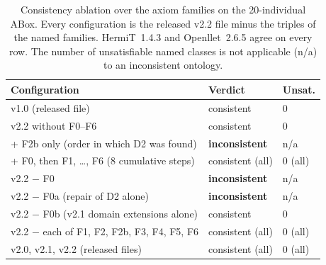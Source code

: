 \begin{table}[!t]
\caption{Consistency ablation over the axiom families on the 20-individual ABox. Every configuration is the released v2.2 file minus the triples of the named families. HermiT~1.4.3 and Openllet~2.6.5 agree on every row. The number of unsatisfiable named classes is not applicable (n/a) to an inconsistent ontology.}
\label{tab:hermit}
\centering
\footnotesize
\begin{tabular}{>{\raggedright\arraybackslash}p{4.6cm}>{\raggedright\arraybackslash}p{1.75cm}p{0.85cm}}
\hline
\textbf{Configuration} & \textbf{Verdict} & \textbf{Unsat.} \\
\hline
v1.0 (released file) & consistent & 0 \\
v2.2 without F0--F6 & consistent & 0 \\
\quad + F2b only (order in which D2 was found) & \textbf{inconsistent} & n/a \\
\quad + F0, then F1, \dots, F6 (8 cumulative steps) & consistent (all) & 0 (all) \\
v2.2 $-$ F0 & \textbf{inconsistent} & n/a \\
\quad v2.2 $-$ F0a (repair of D2 alone) & \textbf{inconsistent} & n/a \\
\quad v2.2 $-$ F0b (v2.1 domain extensions alone) & consistent & 0 \\
v2.2 $-$ each of F1, F2, F2b, F3, F4, F5, F6 & consistent (all) & 0 (all) \\
v2.0, v2.1, v2.2 (released files) & consistent (all) & 0 (all) \\
\hline
\end{tabular}
\end{table}
